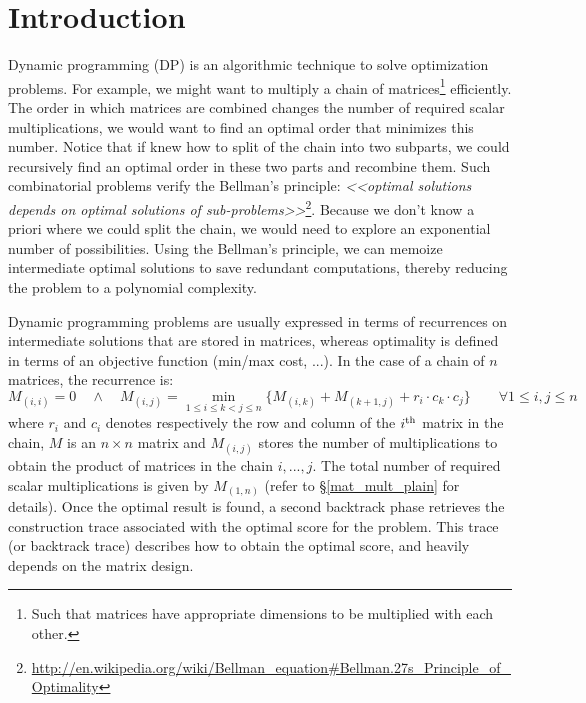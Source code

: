 \newpage
\setcounter{tocdepth}{2} \tableofcontents
\newpage
\section{Introduction} \label{intro}
Dynamic programming (DP) is an algorithmic technique to solve optimization problems. For example, we might want to multiply a chain of matrices\footnote{Such that matrices have appropriate dimensions to be multiplied with each other.} efficiently. The order in which matrices are combined changes the number of required scalar multiplications, we would want to find an optimal order that minimizes this number. Notice that if knew how to split of the chain into two subparts, we could recursively find an optimal order in these two parts and recombine them. Such combinatorial problems verify the Bellman's principle\cite{bellman_principle}: \textit{<<optimal solutions depends on optimal solutions of sub-problems>>}\footnote{\url{http://en.wikipedia.org/wiki/Bellman\_equation\#Bellman.27s\_Principle\_of\_Optimality}}. Because we don't know a priori where we could split the chain, we would need to explore an exponential number of possibilities. Using the Bellman's principle, we can memoize intermediate optimal solutions to save redundant computations, thereby reducing the problem to a polynomial complexity.

Dynamic programming problems are usually expressed in terms of recurrences on intermediate solutions that are stored in matrices, whereas optimality is defined in terms of an objective function (min/max cost, ...). In the case of a chain of $n$ matrices, the recurrence is:
	\[M_{(i,i)}=0 \quad\land\quad M_{(i,j)}=\min_{1\le i\le k<j\le n}\{M_{(i,k)}+M_{(k+1,j)}+r_i \cdot c_k \cdot c_j\} \qquad \forall 1\le i,j\le n\]
where $r_i$ and $c_i$ denotes respectively the row and column of the $i^{\rm th}$ matrix in the chain, $M$ is an $n \times n$ matrix and $M_{(i,j)}$ stores the number of multiplications to obtain the product of matrices in the chain $i,...,j$. The total number of required scalar multiplications is given by $M_{(1,n)}$ (refer to \S\ref{mat_mult_plain} for details). Once the optimal result is found, a second backtrack phase retrieves the construction trace associated with the optimal score for the problem. This trace (or backtrack trace) describes how to obtain the optimal score, and heavily depends on the matrix design.

